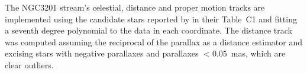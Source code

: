 The NGC3201 stream's celestial, distance and proper motion tracks are implemented using the candidate stars reported by \citet{Palau2021} in their Table~C1 and fitting a seventh degree polynomial to the data in each coordinate. The distance track was computed assuming the reciprocal of the parallax as a distance estimator and excising stars with negative parallaxes and 
parallaxes $<0.05$~mas, which are clear outliers.

